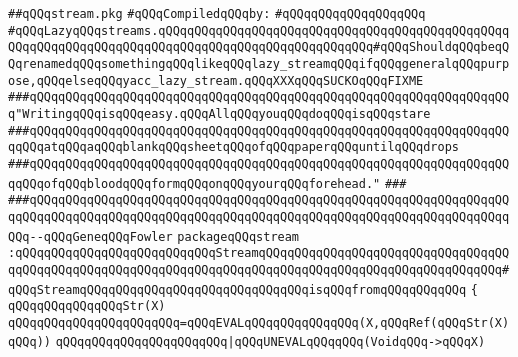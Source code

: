\label{src/app/yacc/lib/stream.pkg}
\verb|##qQQqstream.pkg|\newline
\newline
\verb|#qQQqCompiledqQQqby:|\newline
\verb|#qQQqqQQqqQQqqQQqqQQq|\newline
\newline
\verb|#qQQqLazyqQQqstreams.qQQqqQQqqQQqqQQqqQQqqQQqqQQqqQQqqQQqqQQqqQQqqQQqqQQqqQQqqQQqqQQqqQQqqQQqqQQqqQQqqQQqqQQqqQQqqQQqqQQq#qQQqShouldqQQqbeqQQqrenamedqQQqsomethingqQQqlikeqQQqlazy_streamqQQqifqQQqgeneralqQQqpurpose,qQQqelseqQQqyacc_lazy_stream.qQQqXXXqQQqSUCKOqQQqFIXME|\newline
\newline
\newline
\newline
\verb|###qQQqqQQqqQQqqQQqqQQqqQQqqQQqqQQqqQQqqQQqqQQqqQQqqQQqqQQqqQQqqQQqqQQq"WritingqQQqisqQQqeasy.qQQqAllqQQqyouqQQqdoqQQqisqQQqstare|\newline
\verb|###qQQqqQQqqQQqqQQqqQQqqQQqqQQqqQQqqQQqqQQqqQQqqQQqqQQqqQQqqQQqqQQqqQQqqQQqatqQQqaqQQqblankqQQqsheetqQQqofqQQqpaperqQQquntilqQQqdrops|\newline
\verb|###qQQqqQQqqQQqqQQqqQQqqQQqqQQqqQQqqQQqqQQqqQQqqQQqqQQqqQQqqQQqqQQqqQQqqQQqofqQQqbloodqQQqformqQQqonqQQqyourqQQqforehead."|\newline
\verb|###|\newline
\verb|###qQQqqQQqqQQqqQQqqQQqqQQqqQQqqQQqqQQqqQQqqQQqqQQqqQQqqQQqqQQqqQQqqQQqqQQqqQQqqQQqqQQqqQQqqQQqqQQqqQQqqQQqqQQqqQQqqQQqqQQqqQQqqQQqqQQqqQQqqQQq--qQQqGeneqQQqFowler|\newline
\newline
\newline
\newline
\verb|packageqQQqstream|\newline
\verb|:qQQqqQQqqQQqqQQqqQQqqQQqqQQqStreamqQQqqQQqqQQqqQQqqQQqqQQqqQQqqQQqqQQqqQQqqQQqqQQqqQQqqQQqqQQqqQQqqQQqqQQqqQQqqQQqqQQqqQQqqQQqqQQqqQQqqQQq#qQQqStreamqQQqqQQqqQQqqQQqqQQqqQQqqQQqqQQqisqQQqfromqQQqqQQqqQQq|\newline
\verb|{|\newline
\verb|qQQqqQQqqQQqqQQqStr(X)|\newline
\verb|qQQqqQQqqQQqqQQqqQQqqQQq=qQQqEVALqQQqqQQqqQQqqQQq(X,qQQqRef(qQQqStr(X)qQQq))|\newline
\verb|qQQqqQQqqQQqqQQqqQQqqQQq|\verb#|qQQqUNEVALqQQqqQQq(VoidqQQq->qQQqX)#\newline
